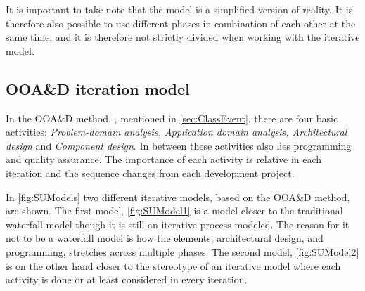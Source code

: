 It is important to take note that the model is a simplified version of reality.
It is therefore also possible to use different phases in combination of each other at the same time, and it is therefore not strictly divided when working with the iterative model.

\subsection{OOA\&D iteration model}\label{sec:Iterative3}
In the OOA\&D method, \cite{Rod-Aalborg}, mentioned in \cref{sec:ClassEvent}, there are four basic activities; \textit{Problem-domain analysis, Application domain analysis, Architectural design} and \textit{Component design}.
In between these activities also lies programming and quality assurance.
The importance of each activity is relative in each iteration and the sequence changes from each development project.

In \cref{fig:SUModels} two different iterative models, based on the OOA\&D method, are shown.
The first model, \cref{fig:SUModel1} is a model closer to the traditional waterfall model though it is still an iterative process modeled.
The reason for it not to be a waterfall model is how the elements; architectural design, and programming, stretches across multiple phases.
The second model, \cref{fig:SUModel2} is on the other hand closer to the stereotype of an iterative model where each activity is done or at least considered in every iteration. 

